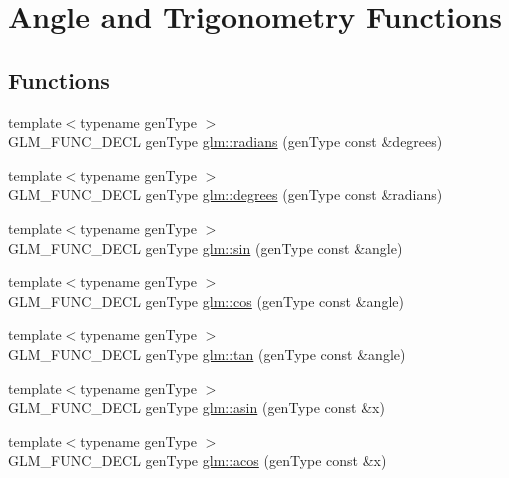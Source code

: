 \hypertarget{group__core__func__trigonometric}{}\section{Angle and Trigonometry Functions}
\label{group__core__func__trigonometric}
\subsection*{Functions}
\begin{DoxyCompactItemize}
\item 
{\footnotesize template$<$typename gen\+Type $>$ }\\G\+L\+M\+\_\+\+F\+U\+N\+C\+\_\+\+D\+E\+CL gen\+Type \hyperlink{group__core__func__trigonometric_ga431d31cdb060059bc5b0696e212f1453}{glm\+::radians} (gen\+Type const \&degrees)
\item 
{\footnotesize template$<$typename gen\+Type $>$ }\\G\+L\+M\+\_\+\+F\+U\+N\+C\+\_\+\+D\+E\+CL gen\+Type \hyperlink{group__core__func__trigonometric_gaf4e5661bd1c993f6090d49e988a4c78a}{glm\+::degrees} (gen\+Type const \&radians)
\item 
{\footnotesize template$<$typename gen\+Type $>$ }\\G\+L\+M\+\_\+\+F\+U\+N\+C\+\_\+\+D\+E\+CL gen\+Type \hyperlink{group__core__func__trigonometric_gafbab21016b7f3bc21afb09a7e42e2df1}{glm\+::sin} (gen\+Type const \&angle)
\item 
{\footnotesize template$<$typename gen\+Type $>$ }\\G\+L\+M\+\_\+\+F\+U\+N\+C\+\_\+\+D\+E\+CL gen\+Type \hyperlink{group__core__func__trigonometric_gac6708d4f0895dc79b65f50db00840167}{glm\+::cos} (gen\+Type const \&angle)
\item 
{\footnotesize template$<$typename gen\+Type $>$ }\\G\+L\+M\+\_\+\+F\+U\+N\+C\+\_\+\+D\+E\+CL gen\+Type \hyperlink{group__core__func__trigonometric_ga328aeb0de4f312dc3d200cb929715d44}{glm\+::tan} (gen\+Type const \&angle)
\item 
{\footnotesize template$<$typename gen\+Type $>$ }\\G\+L\+M\+\_\+\+F\+U\+N\+C\+\_\+\+D\+E\+CL gen\+Type \hyperlink{group__core__func__trigonometric_gafca5e8c71ea06be0840227b4aafc5680}{glm\+::asin} (gen\+Type const \&x)
\item 
{\footnotesize template$<$typename gen\+Type $>$ }\\G\+L\+M\+\_\+\+F\+U\+N\+C\+\_\+\+D\+E\+CL gen\+Type \hyperlink{group__core__func__trigonometric_gac85497ed2e39d4cac4ac32bed4dfc506}{glm\+::acos} (gen\+Type const \&x)

\end{DoxyCompactItemize}
